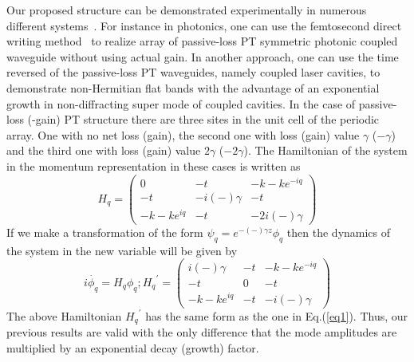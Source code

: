 \documentclass[aps,prl,twocolumn,showpacs,groupedaddress,amsmath,amssymb]{revtex4}
\begin{document}
Our proposed structure can be demonstrated experimentally in numerous different systems \cite{27,34,35,36,37}. For instance in photonics, one can use the femtosecond direct writing method \cite{38} to realize array of passive-loss PT symmetric photonic coupled waveguide without using actual gain. In another approach, one can use the time reversed of the passive-loss PT waveguides, namely coupled laser cavities, to demonstrate non-Hermitian flat bands with the advantage of an exponential growth in non-diffracting super mode of coupled cavities. In the case of passive-loss (-gain) PT structure there are three sites in the unit cell of the periodic array. One with no net loss (gain), the second one with loss (gain) value $\gamma$ ($-\gamma$) and the third one with loss (gain) value $2\gamma$ ($-2\gamma$). The Hamiltonian of the system in the momentum representation in these cases is written as 
\begin{equation}
H_q=\left(\begin{array}{ccc}
0&-t&-k-ke^{-iq}\\
-t&-i(-)\gamma&-t\\
-k-ke^{iq}&-t&-2i(-)\gamma
\end{array}\right)
\end{equation}
If we make a transformation of the form $\psi_q=e^{-(-)\gamma z}\phi_q$ then the dynamics of the system in the new variable will be given by 
\begin{equation}
i\dot{\phi_q}={H_q} \phi_q ;{H_q}^\prime=\left(\begin{array}{ccc}
i(-)\gamma&-t&-k-ke^{-iq}\\
-t&0&-t\\
-k-ke^{iq}&-t&-i(-)\gamma
\end{array}\right)
\end{equation}
The above Hamiltonian ${H_q}^\prime$ has the same form as the one in Eq.(\ref{eq1}). Thus, our previous results are valid with the only difference that the mode amplitudes are multiplied by an exponential decay (growth) factor. 
\end{document}
